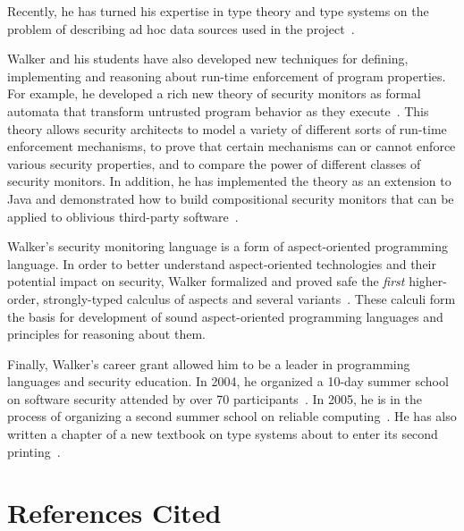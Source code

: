 \documentclass[11pt]{article}
\begin{document}
Recently, he has turned his expertise in type theory and type systems
on the problem of describing ad hoc data sources used in the
\pads{} project~\cite{fisher+:pads-semantics}.  

Walker and his students have also developed new techniques for defining,
implementing and reasoning about run-time enforcement of program properties.
For example, he developed a rich new theory of security monitors as formal
automata that transform untrusted program behavior as they 
execute~\cite{ligatti+:edit-automata,ligatti+:renewal}.
This theory allows security
architects to model a variety of different sorts of run-time
enforcement mechanisms, to prove that certain mechanisms can or cannot
enforce various security properties, and to compare the power of
different classes of security monitors.    
In addition, he has implemented the theory as 
an extension to Java and demonstrated
how to build compositional security monitors that 
can be applied to oblivious third-party 
software~\cite{bauer+:polymer}.

Walker's security monitoring language is a 
form of aspect-oriented programming language.
In order to better understand aspect-oriented technologies and their
potential impact on security, Walker formalized and proved
safe the {\em first} higher-order, strongly-typed calculus of 
aspects and several 
variants~\cite{walker+:aspects,dantas+:harmless-advice,ligatti+:aspectsjournal,dantas+:polyaml}.
These calculi form the basis for development of sound aspect-oriented
programming languages and principles for reasoning about them.

Finally, Walker's career grant allowed him to be a leader in
programming languages and security education. In 2004, he organized
a 10-day summer school on software security 
attended by over 70 participants~\cite{summerschool04}.  In 2005, he is 
in the process of
organizing a second summer school on reliable computing~\cite{summerschool05}. 
 He has also written a
chapter of a new textbook on type systems about to enter its
second printing~\cite{walker:attapl}.



\newpage
\section{References Cited}
{
 \small
} \newpage
\end{document}
